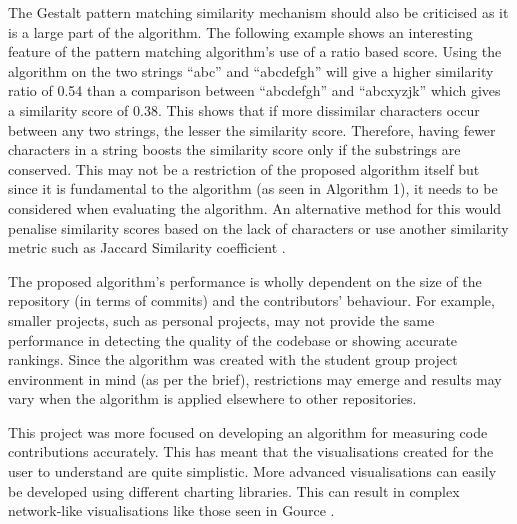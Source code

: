 The Gestalt pattern matching similarity mechanism should also be criticised as it is a large part of the algorithm. The following example shows an interesting feature of the pattern matching algorithm's use of a ratio based score. Using the algorithm on the two strings “abc” and “abcdefgh” will give a higher similarity ratio of 0.54 than a comparison between “abcdefgh” and “abcxyzjk” which gives a similarity score of 0.38. This shows that if more dissimilar characters occur between any two strings, the lesser the similarity score. Therefore, having fewer characters in a string boosts the similarity score only if the substrings are conserved. This may not be a restriction of the proposed algorithm itself but since it is fundamental to the algorithm (as seen in Algorithm 1), it needs to be considered when evaluating the algorithm. An alternative method for this would penalise similarity scores based on the lack of characters or use another similarity metric such as Jaccard Similarity coefficient \citep{stephanie_2016}. 

The proposed algorithm’s performance is wholly dependent on the size of the repository (in terms of commits) and the contributors' behaviour. For example, smaller projects, such as personal projects, may not provide the same performance in detecting the quality of the codebase or showing accurate rankings. Since the algorithm was created with the student group project environment in mind (as per the brief), restrictions may emerge and results may vary when the algorithm is applied elsewhere to other repositories. 

This project was more focused on developing an algorithm for measuring code contributions accurately. This has meant that the visualisations created for the user to understand are quite simplistic. More advanced visualisations can easily be developed using different charting libraries. This can result in complex network-like visualisations like those seen in Gource \citep{caudwell_2017}.
